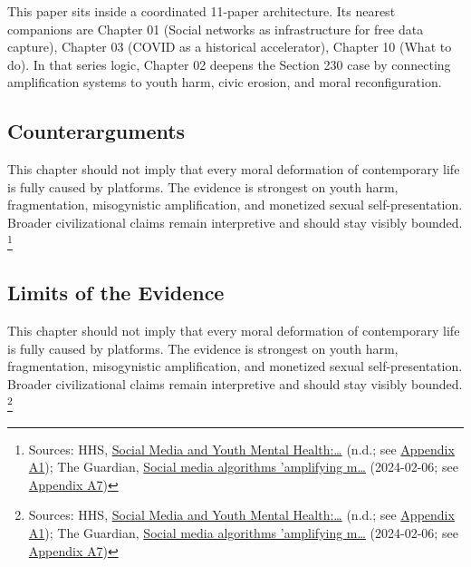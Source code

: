 \documentclass[
  american,
  11pt,
  letterpaper,
]{article}
\begin{document}
This paper sits inside a coordinated 11-paper architecture. Its nearest
companions are Chapter 01 (Social networks as infrastructure for free
data capture), Chapter 03 (COVID as a historical accelerator), Chapter
10 (What to do). In that series logic, Chapter 02 deepens the Section
230 case by connecting amplification systems to youth harm, civic
erosion, and moral reconfiguration.

\subsection{Counterarguments}\label{counterarguments-2}

This chapter should not imply that every moral deformation of
contemporary life is fully caused by platforms. The evidence is
strongest on youth harm, fragmentation, misogynistic amplification, and
monetized sexual self-presentation. Broader civilizational claims remain
interpretive and should stay visibly bounded. \footnote{Sources: HHS,
  \href{https://www.hhs.gov/surgeongeneral/priorities/youth-mental-health/social-media/index.html}{Social
  Media and Youth Mental Health:\ldots{}} (n.d.; see
  \hyperref[ch-02-appendix-a1-social-media-and-youth-mental-health-the-u-s-surgeon-general-s-advisory]{Appendix
  A1}); The Guardian,
  \href{https://www.theguardian.com/media/2024/feb/06/social-media-algorithms-amplifying-misogynistic-content}{Social
  media algorithms 'amplifying m\ldots{}} (2024-02-06; see
  \hyperref[ch-02-appendix-a7-social-media-algorithms-amplifying-misogynistic-content]{Appendix
  A7})}

\subsection{Limits of the Evidence}\label{limits-of-the-evidence-2}

This chapter should not imply that every moral deformation of
contemporary life is fully caused by platforms. The evidence is
strongest on youth harm, fragmentation, misogynistic amplification, and
monetized sexual self-presentation. Broader civilizational claims remain
interpretive and should stay visibly bounded. \footnote{Sources: HHS,
  \href{https://www.hhs.gov/surgeongeneral/priorities/youth-mental-health/social-media/index.html}{Social
  Media and Youth Mental Health:\ldots{}} (n.d.; see
  \hyperref[ch-02-appendix-a1-social-media-and-youth-mental-health-the-u-s-surgeon-general-s-advisory]{Appendix
  A1}); The Guardian,
  \href{https://www.theguardian.com/media/2024/feb/06/social-media-algorithms-amplifying-misogynistic-content}{Social
  media algorithms 'amplifying m\ldots{}} (2024-02-06; see
  \hyperref[ch-02-appendix-a7-social-media-algorithms-amplifying-misogynistic-content]{Appendix
  A7})}
\end{document}
